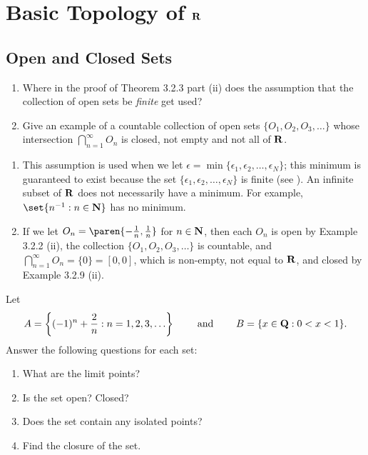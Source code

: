 \documentclass{lew98_solutions}
\begin{document}
\chapter{Basic Topology of \texorpdfstring{\( \mathbf{R} \)}{}}
\label{chap:3}

\setcounter{section}{1}
\section{Open and Closed Sets}
\label{sec:3.2}

\begin{exercise}
\label{ex:3.2.1}
    \begin{enumerate}
        \item Where in the proof of Theorem 3.2.3 part (ii) does the assumption that the collection of open sets be \textit{finite} get used?

        \item Give an example of a countable collection of open sets \( \{ O_1, O_2, O_3, \ldots \} \) whose intersection \( \bigcap_{n=1}^{\infty} O_n \) is closed, not empty and not all of \( \mathbf{R} \).
    \end{enumerate}
\end{exercise}

\begin{solution}
    \begin{enumerate}
        \item This assumption is used when we let \( \epsilon = \min \{ \epsilon_1, \epsilon_2, \ldots, \epsilon_N \} \); this minimum is guaranteed to exist because the set \( \{ \epsilon_1, \epsilon_2, \ldots, \epsilon_N \} \) is finite (see ). An infinite subset of \( \mathbf{R} \) does not necessarily have a minimum. For example, \( \set{ n^{-1} : n \in \N } \) has no minimum.

        \item If we let \( O_n = \paren{ -\tfrac{1}{n}, \tfrac{1}{n} } \) for \( n \in \mathbf{N} \), then each \( O_n \) is open by Example 3.2.2 (ii), the collection \( \{ O_1, O_2, O_3, \ldots \} \) is countable, and \( \bigcap_{n=1}^{\infty} O_n = \{ 0 \} = [0, 0] \), which is non-empty, not equal to \( \mathbf{R} \), and closed by Example 3.2.9 (ii).
    \end{enumerate}
\end{solution}

\begin{exercise}
\label{ex:3.2.2}
    Let
    \[
        A = \left\{ (-1)^n + \frac{2}{n} : n = 1, 2, 3, \ldots \right\} \hspace{8mm} \text{and} \hspace{8mm} B = \{ x \in \mathbf{Q} : 0 < x < 1 \}.
    \]
    Answer the following questions for each set:
    \begin{enumerate}
        \item What are the limit points?

        \item Is the set open? Closed?

        \item Does the set contain any isolated points?

        \item Find the closure of the set.
    \end{enumerate}
\end{exercise}
\end{document}
